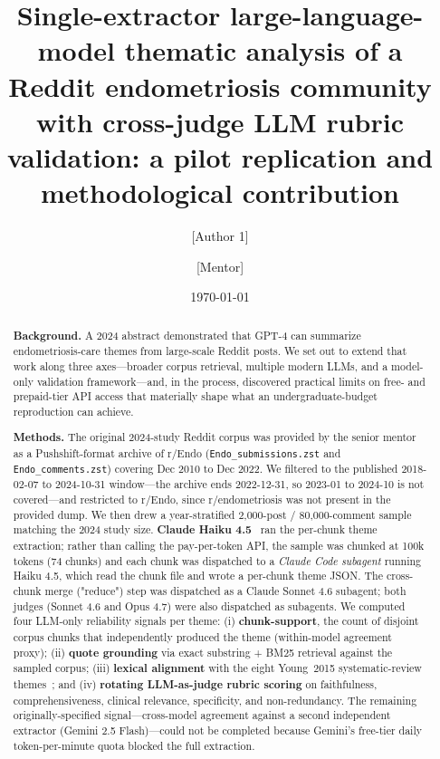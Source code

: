 \documentclass[11pt]{article}
\title{Single-extractor large-language-model thematic analysis of a Reddit
endometriosis community with cross-judge LLM rubric validation: a
pilot replication and methodological contribution}
\author[1]{[Author 1]}
\author[1]{[Mentor]}
\affil[1]{[Institution]}
\date{\today}
\begin{document}
\maketitle

\begin{abstract}
\noindent
\textbf{Background.}
A 2024 abstract demonstrated that GPT-4 can summarize endometriosis-care
themes from large-scale Reddit posts. We set out to extend that work
along three axes---broader corpus retrieval, multiple modern LLMs, and
a model-only validation framework---and, in the process, discovered
practical limits on free- and prepaid-tier API access that materially
shape what an undergraduate-budget reproduction can achieve.

\noindent
\textbf{Methods.}
The original 2024-study Reddit corpus was provided by the senior
mentor as a Pushshift-format archive of r/Endo (\texttt{Endo\_submissions.zst}
and \texttt{Endo\_comments.zst}) covering Dec 2010 to Dec 2022.
We filtered to the published 2018-02-07 to 2024-10-31 window---the
archive ends 2022-12-31, so 2023-01 to 2024-10 is not covered---and
restricted to r/Endo, since r/endometriosis was not present in the
provided dump. We then drew a year-stratified 2{,}000-post /
80{,}000-comment sample matching the 2024 study size. \textbf{Claude
Haiku 4.5}~\cite{anthropic_claude_haiku} ran the per-chunk theme
extraction; rather than calling the pay-per-token API, the sample was
chunked at 100k tokens (74 chunks) and each chunk was dispatched to a
\emph{Claude Code subagent} running Haiku 4.5, which read the chunk
file and wrote a per-chunk theme JSON. The cross-chunk merge ("reduce")
step was dispatched as a Claude Sonnet 4.6 subagent; both judges
(Sonnet 4.6 and Opus 4.7) were also dispatched as subagents. We
computed four LLM-only reliability signals per theme: (i)
\textbf{chunk-support}, the count of disjoint corpus chunks that
independently produced the theme (within-model agreement proxy);
(ii) \textbf{quote grounding} via exact substring + BM25 retrieval
against the sampled corpus; (iii) \textbf{lexical alignment} with the
eight Young~2015 systematic-review themes~\cite{young2015}; and (iv)
\textbf{rotating LLM-as-judge rubric scoring} on faithfulness,
comprehensiveness, clinical relevance, specificity, and non-redundancy.
The remaining originally-specified signal---cross-model agreement against a
second independent extractor (Gemini 2.5 Flash)---could not be
completed because Gemini's free-tier daily token-per-minute quota
blocked the full extraction.


\end{abstract}
\end{document}
